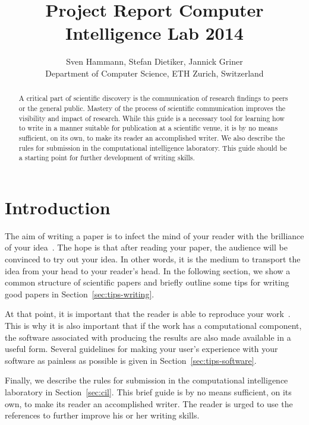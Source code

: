 \documentclass[10pt,conference,compsocconf]{IEEEtran}
\begin{document}
\title{Project Report Computer Intelligence Lab 2014}

\author{
  Sven Hammann, Stefan Dietiker, Jannick Griner\\
  Department of Computer Science, ETH Zurich, Switzerland
}

\maketitle

\begin{abstract}
  A critical part of scientific discovery is the
  communication of research findings to peers or the general public.
  Mastery of the process of scientific communication improves the
  visibility and impact of research. While this guide is a necessary
  tool for learning how to write in a manner suitable for publication
  at a scientific venue, it is by no means sufficient, on its own, to
  make its reader an accomplished writer. We also describe the rules
  for submission in the computational intelligence laboratory.
  This guide should be a
  starting point for further development of writing skills.
\end{abstract}

\section{Introduction}

The aim of writing a paper is to infect the mind of your reader with
the brilliance of your idea~\cite{jones08}. 
The hope is that after reading your paper, the audience will be convinced to try out your idea. In other words, it is the medium to transport the idea from your head to your reader's head. In the following section, we show a common structure of scientific papers and briefly outline some tips for writing good papers in Section~\ref{sec:tips-writing}.

At that point, it is important that the reader is able to reproduce your work~\cite{schwab00,wavelab,gentleman05}. This is why it is also important that if the work has a computational component, the software associated with producing the results are also made available in a useful form. Several guidelines for making your user's experience with your software as painless as possible is given in Section~\ref{sec:tips-software}.

Finally, we describe the rules for submission in the computational intelligence laboratory in Section~\ref{sec:cil}. This brief guide is by no means sufficient, on its own, to make its reader an accomplished writer. The reader is urged to use the references to further improve his or her writing skills.
\end{document}
